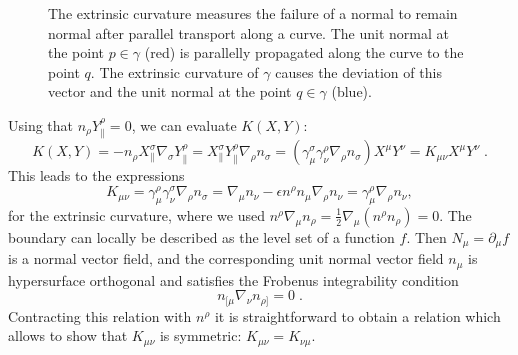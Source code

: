 \begin{figure}
\centering
{}
\label{fig:extcurv}
\caption[Illustration of the interpretation of the extrinsic curvature]{The extrinsic curvature measures the failure of a normal to remain normal after parallel transport along a curve. The unit normal at the point $p \in \gamma$ (red) is parallelly propagated along the curve to the point $q$. The extrinsic curvature of $\gamma$ causes the deviation of this vector and the unit normal at the point $q \in \gamma$ (blue).}
\end{figure}
Using that $n_\rho Y^\rho_\parallel = 0$, we can evaluate $K(X,Y)$:
\begin{equation}
			K(X,Y) 
			= - n_\rho X_\parallel^\sigma \nabla_\sigma Y_\parallel^\rho 
			= X_\parallel^\sigma Y_\parallel^\rho \nabla_\rho n_\sigma 
		= (\gamma^\sigma_\mu \gamma^\rho_\nu  \nabla_\rho n_\sigma) X^\mu Y^\nu 
		 = K_{\mu \nu} X^\mu Y^\nu\;.
	\end{equation}
This leads to the expressions
\begin{equation}
\label{eq:extcur0}
	K_{\mu \nu} =  \gamma^\rho_\mu \gamma^\sigma_\nu \nabla_\rho n_\sigma 
	= \nabla_\mu n_\nu - \epsilon n^\rho n_\mu \nabla_\rho n_\nu
	=  \gamma^\rho_\mu \nabla_\rho n_\nu,
\end{equation}
for the extrinsic curvature, where we used $n^\rho \nabla_\mu n_\rho = \frac{1}{2} \nabla_\mu (n^\rho n_\rho)=0$. The boundary can locally be described as the level set of a function $f$. Then $N_\mu = \partial_\mu f$ is a normal vector field, and the corresponding  unit normal vector field $n_\mu$ is hypersurface orthogonal and satisfies the Frobenus integrability condition
\begin{equation}
n_{[\mu} \nabla_\nu n_{\rho]} = 0 \;.
\end{equation}
Contracting this relation with $n^\rho$ it is straightforward to obtain a relation which allows to show that $K_{\mu\nu}$ is symmetric: $K_{\mu \nu} = K_{\nu \mu}$.


